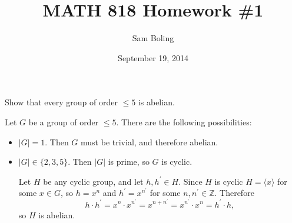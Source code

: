 \documentclass{article}
\title{MATH 818 Homework \#1}
\date{September 19, 2014}
\author{Sam Boling}
\newcounter{Problem}
\newenvironment{Problem}{\begin{Exercise}[name={Problem},
                                          counter={Problem}]}
                        {\end{Exercise}}
\begin{document}
\begin{titlepage}
\maketitle
\end{titlepage}

\begin{Problem}
Show that every group of order $\leq 5$ is abelian.
\end{Problem}

\begin{Answer}
Let $G$ be a group of order $\leq 5$. There are the following possibilities:
\begin{itemize}
  \item{$|G| = 1$. Then $G$ must be trivial, and therefore abelian.}
  \item{$|G| \in \{2, 3, 5\}$. Then $|G|$ is prime, so $G$ is cyclic.

        Let $H$ be any cyclic group, and let $h, h^\prime \in
        H$. Since $H$ is cyclic $H = \langle x \rangle$ for some $x
        \in G$, so $h = x^n$ and $h^\prime =
        x^{n^\prime}$ for some $n, n^\prime \in \mathbb{Z}$. Therefore
        $$
        h \cdot h^\prime 
      = x^n \cdot x^{n^\prime} 
      = x^{n + n^\prime}
      = x^{n^\prime} \cdot x^{n}
      = h^\prime \cdot h,
        $$
        so $H$ is abelian.

}
\end{itemize}
\end{Answer}
\end{document}
